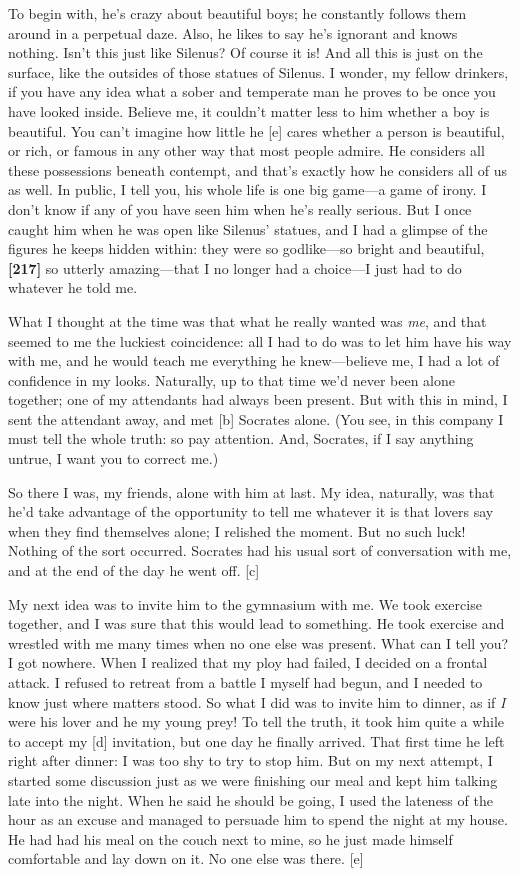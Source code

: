 To begin with, he's crazy about beautiful boys; he constantly follows
them around in a perpetual daze. Also, he likes to say he's ignorant and
knows nothing. Isn't this just like Silenus? Of course it is! And all
this is just on the surface, like the outsides of those statues of
Silenus. I wonder, my fellow drinkers, if you have any idea what a sober
and temperate man he proves to be once you have looked inside. Believe
me, it couldn't matter less to him whether a boy is beautiful. You can't
imagine how little he {[}e{]} cares whether a person is beautiful, or
rich, or famous in any other way that most people admire. He considers
all these possessions beneath contempt, and that's exactly how he
considers all of us as well. In public, I tell you, his whole life is
one big game---a game of irony. I don't know if any of you have seen him
when he's really serious. But I once caught him when he was open like
Silenus' statues, and I had a glimpse of the figures he keeps hidden
within: they were so godlike---so bright and beautiful, {\bf {[}217{]}}
so utterly amazing---that I no longer had a choice---I just had to do
whatever he told me.

What I thought at the time was that what he really wanted was {\em me},
and that seemed to me the luckiest coincidence: all I had to do was to
let him have his way with me, and he would teach me everything he
knew---believe me, I had a lot of confidence in my looks. Naturally, up
to that time we'd never been alone together; one of my attendants had
always been present. But with this in mind, I sent the attendant away,
and met {[}b{]} Socrates alone. (You see, in this company I must tell
the whole truth: so pay attention. And, Socrates, if I say anything
untrue, I want you to correct me.)

So there I was, my friends, alone with him at last. My idea, naturally,
was that he'd take advantage of the opportunity to tell me whatever it
is that lovers say when they find themselves alone; I relished the
moment. But no such luck! Nothing of the sort occurred. Socrates had his
usual sort of conversation with me, and at the end of the day he went
off. {[}c{]}

My next idea was to invite him to the gymnasium with me. We took
exercise together, and I was sure that this would lead to something. He
took exercise and wrestled with me many times when no one else was
present. What can I tell you? I got nowhere. When I realized that my
ploy had failed, I decided on a frontal attack. I refused to retreat
from a battle I myself had begun, and I needed to know just where
matters stood. So what I did was to invite him to dinner, as if {\em I}
were his lover and he my young prey! To tell the truth, it took him
quite a while to accept my {[}d{]} invitation, but one day he finally
arrived. That first time he left right after dinner: I was too shy to
try to stop him. But on my next attempt, I started some discussion just
as we were finishing our meal and kept him talking late into the night.
When he said he should be going, I used the lateness of the hour as an
excuse and managed to persuade him to spend the night at my house. He
had had his meal on the couch next to mine, so he just made himself
comfortable and lay down on it. No one else was there. {[}e{]}

